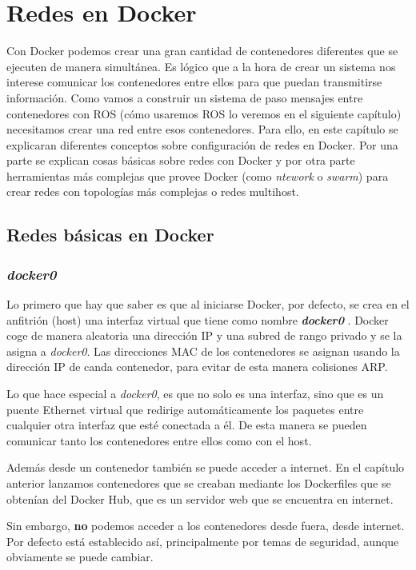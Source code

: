 \chapter{Redes en Docker}
Con Docker podemos crear una gran cantidad de contenedores diferentes que se ejecuten de manera simultánea. Es lógico que a la hora de crear un sistema nos interese comunicar los contenedores entre ellos para que puedan transmitirse información. Como vamos a construir un sistema de paso mensajes entre contenedores con ROS (cómo usaremos ROS lo veremos en el siguiente capítulo) necesitamos crear una red entre esos contenedores. Para ello, en este capítulo se explicaran diferentes conceptos sobre configuración de redes en Docker. Por una parte se explican cosas básicas sobre redes con Docker y por otra parte herramientas más complejas que provee Docker (como \emph{ntework} o \emph{swarm}) para crear redes con topologías más complejas o redes multihost.

	\section{Redes básicas en Docker}

		\subsection{\textit{docker0}}
		Lo primero que hay que saber es que al iniciarse Docker, por defecto, se crea en el anfitrión (host) una interfaz virtual que tiene como nombre \textbf{\emph{docker0}} \cite{docker-network-advanced}. Docker coge de manera aleatoria una dirección IP y una subred de rango privado y se la asigna a \emph{docker0}. Las direcciones MAC de los contenedores se asignan usando la dirección IP de canda contenedor, para evitar de esta manera colisiones ARP.
		
		Lo que hace especial a \emph{docker0}, es que no solo es una interfaz, sino que es un puente Ethernet virtual que redirige automáticamente los paquetes entre cualquier otra interfaz que esté conectada a él. De esta manera se pueden comunicar tanto los contenedores entre ellos como con el host.
		
		Además desde un contenedor también se puede acceder a internet. En el capítulo anterior lanzamos contenedores que se creaban mediante los Dockerfiles que se obtenían del Docker Hub, que es un servidor web que se encuentra en internet. 
		
		Sin embargo, \textbf{no} podemos acceder a los contenedores desde fuera, desde internet. Por defecto está 
		establecido así, principalmente por temas de seguridad, aunque obviamente se puede cambiar.
		
